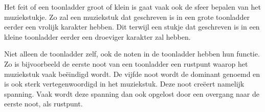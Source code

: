 Het feit of een toonladder groot of klein is gaat vaak ook de sfeer bepalen van het muziekstukje. Zo zal een muziekstuk dat geschreven is in een grote toonladder eerder een vrolijk karakter hebben. Dit terwijl een stukje dat geschreven is in een kleine toonladder eerder een droeviger karakter zal hebben. 

Niet alleen de toonladder zelf, ook de noten in de toonladder hebben hun functie. Zo is bijvoorbeeld de eerste noot van een toonladder een rustpunt waarop het muziekstuk vaak be\"eindigd wordt. De vijfde noot wordt de dominant genoemd en is ook sterk vertegenwoordigd in het muziekstuk. Deze noot cre\"eert namelijk spanning. Vaak wordt deze spanning dan ook opgelost door een overgang naar de eerste noot, als rustpunt.


